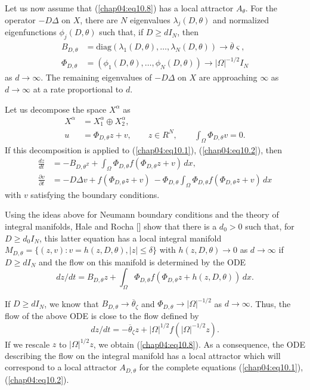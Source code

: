 \documentclass{surv-l}
\theoremstyle{plain}
\theoremstyle{definition}
\numberwithin{equation}{section}
\numberwithin{figure}{chapter}
\begin{document}
Let us now assume that (\ref{chap04:eq10.8}) has a local attractor $A_{\theta}$. For the operator $-D\Delta$ on $X$, there are $N$ eigenvalues $\lambda_{j}(D, \theta)$ and normalized eigenfunctions $\phi_{j}(D, \theta)$ such that, if $D\geq dI_{N}$, then
\begin{align*}
B_{D,\theta}&=\mathrm{diag}(\lambda_{1}(D, \theta), \ldots, \lambda_{N}(D, \theta))\rightarrow\overline{\theta}\varsigma,\\
\Phi_{D,\theta}&=(\phi_{1}(D, \theta), \ldots, \phi_{N}(D, \theta))\rightarrow|\Omega|^{-1/2}I_{N}
\end{align*}
as $ d\rightarrow\infty$. The remaining eigenvalues of $-D\Delta$ on $X$ are approaching $\infty$ as $ d\rightarrow\infty$ at a rate proportional to $d$.

Let us decompose the space $X^{\alpha}$ as
\begin{align*}
X^{\alpha}&=X_{1}^{\alpha}\oplus X_{2}^{\alpha},\\
u&=\Phi_{D,\theta}z+v,\quad\quad z\in R^{N},\quad\quad \int_{\Omega}\Phi_{D,\theta}v=0.
\end{align*}
If this decomposition is applied to (\ref{chap04:eq10.1}), (\ref{chap04:eq10.2}), then
\begin{align*}
\frac{dz}{dt}&=-B_{D,\theta^{Z}}+\int_{\Omega}\Phi_{D,\theta}f(\Phi_{D,\theta}z+v)\, dx,\\
\frac{\partial v}{\partial t}&=-D\Delta v+f(\Phi_{D,\theta}z+v)\ -\Phi_{D,\theta}\int_{\Omega}\Phi_{D,\theta}f(\Phi_{D,\theta}z+v)\,dx
\end{align*}
with $v$ satisfying the boundary conditions.

Using the ideas above for Neumann boundary conditions and the theory of integral manifolds, Hale and Rocha [\citeyear{1987hra}] show that there is a $d_{0}>0$ such that, for $D\geq d_{0}I_{N}$, this latter equation has a local integral manifold $M_{D,\theta}=\{(z, v):v=h(z, D, \theta), |z|\leq\delta\}$ with $h(z, D, \theta)\rightarrow 0$ as $ d\rightarrow\infty$ if $D\geq dI_{N}$ and the flow on this manifold is determined by the ODE
\begin{equation*}
dz/dt=B_{D,\theta}z+\int_{\Omega}\Phi_{D,\theta}f(\Phi_{D,\theta}z+h(z, D, \theta))\, dx.
\end{equation*}

If $D\geq dI_{N}$, we know that $B_{D,\theta}\rightarrow\overline{\theta}_{\zeta}$ and $\Phi_{D,\theta}\rightarrow|\Omega|^{-1/2}$ as $ d\rightarrow\infty$. Thus, the flow of the above ODE is close to the flow defined by
\begin{equation*}
dz/dt=-\overline{\theta}_{\zeta}z+|\Omega|^{1/2}f(|\Omega|^{-1/2}z).
\end{equation*}
If we rescale $z$ to $|\Omega|^{1/2}z$, we obtain (\ref{chap04:eq10.8}). As a consequence, the ODE describing the flow on the integral manifold has a local attractor which will correspond to a local attractor $A_{D,\theta}$ for the complete equations (\ref{chap04:eq10.1}), (\ref{chap04:eq10.2}).
\end{document}

